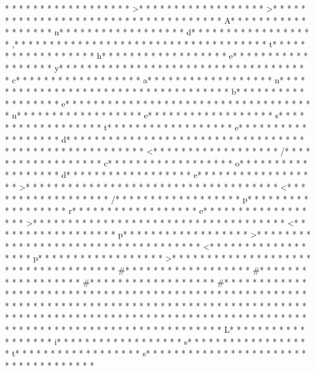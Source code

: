 * * *  * * *  * * *  *  * * *  *  * * *  * >* * *  * * *  * * *  *  * * *  *  * * *  * >* * *  * * *  * * *  *  * * *  *  * * *  *  * * *  * * *  * * *  *  * * *  *  * * *  * A* * *  * * *  * * *  *  * * *  *  * * *  * n* * *  * * *  * * *  *  * * *  *  * * *  * d* * *  * * *  * * *  *  * * *  *  * * *  * ,* * *  * * *  * * *  *  * * *  *  * * *  *  * * *  * * *  * * *  *  * * *  *  * * *  * t* * *  * * *  * * *  *  * * *  *  * * *  * h* * *  * * *  * * *  *  * * *  *  * * *  * e* * *  * * *  * * *  *  * * *  *  * * *  * y* * *  * * *  * * *  *  * * *  *  * * *  *  * * *  * * *  * * *  *  * * *  *  * * *  * c* * *  * * *  * * *  *  * * *  *  * * *  * a* * *  * * *  * * *  *  * * *  *  * * *  * n* * *  * * *  * * *  *  * * *  *  * * *  *  * * *  * * *  * * *  *  * * *  *  * * *  * b* * *  * * *  * * *  *  * * *  *  * * *  * e* * *  * * *  * * *  *  * * *  *  * * *  *  * * *  * * *  * * *  *  * * *  *  * * *  * n* * *  * * *  * * *  *  * * *  *  * * *  * e* * *  * * *  * * *  *  * * *  *  * * *  * s* * *  * * *  * * *  *  * * *  *  * * *  * t* * *  * * *  * * *  *  * * *  *  * * *  * e* * *  * * *  * * *  *  * * *  *  * * *  * d* * *  * * *  * * *  *  * * *  *  * * *  * 
* * *  * * *  * * *  *  * * *  *  * * *  * 
* * *  * * *  * * *  *  * * *  *  * * *  * <* * *  * * *  * * *  *  * * *  *  * * *  * /* * *  * * *  * * *  *  * * *  *  * * *  * c* * *  * * *  * * *  *  * * *  *  * * *  * o* * *  * * *  * * *  *  * * *  *  * * *  * d* * *  * * *  * * *  *  * * *  *  * * *  * e* * *  * * *  * * *  *  * * *  *  * * *  * >* * *  * * *  * * *  *  * * *  *  * * *  * 
* * *  * * *  * * *  *  * * *  *  * * *  * <* * *  * * *  * * *  *  * * *  *  * * *  * /* * *  * * *  * * *  *  * * *  *  * * *  * p* * *  * * *  * * *  *  * * *  *  * * *  * r* * *  * * *  * * *  *  * * *  *  * * *  * e* * *  * * *  * * *  *  * * *  *  * * *  * >* * *  * * *  * * *  *  * * *  *  * * *  * 
* * *  * * *  * * *  *  * * *  *  * * *  * <* * *  * * *  * * *  *  * * *  *  * * *  * p* * *  * * *  * * *  *  * * *  *  * * *  * >* * *  * * *  * * *  *  * * *  *  * * *  * 
* * *  * * *  * * *  *  * * *  *  * * *  * <* * *  * * *  * * *  *  * * *  *  * * *  * p* * *  * * *  * * *  *  * * *  *  * * *  * >* * *  * * *  * * *  *  * * *  *  * * *  * 
* * *  * * *  * * *  *  * * *  *  * * *  * #* * *  * * *  * * *  *  * * *  *  * * *  * #* * *  * * *  * * *  *  * * *  *  * * *  * #* * *  * * *  * * *  *  * * *  *  * * *  * #* * *  * * *  * * *  *  * * *  *  * * *  *  * * *  * * *  * * *  *  * * *  *  * * *  * * *  * * *  *  * * *  *  * * *  * * *  * * *  *  * * *  *  * * *  *  * * *  * * *  * * *  *  * * *  *  * * *  *  * * *  * * *  * * *  *  * * *  *  * * *  *  * * *  * * *  * * *  *  * * *  *  * * *  *  * * *  * * *  * * *  *  * * *  *  * * *  *  * * *  * * *  * * *  *  * * *  *  * * *  * {* * *  * * *  * * *  *  * * *  *  * * *  * L* * *  * * *  * * *  *  * * *  *  * * *  * i* * *  * * *  * * *  *  * * *  *  * * *  * s* * *  * * *  * * *  *  * * *  *  * * *  * t* * *  * * *  * * *  *  * * *  *  * * *  * s* * *  * * *  * * *  *  * * *  *  * * *  * }* * *  * * *  * * *  *  * * *  *  * * *  * 
